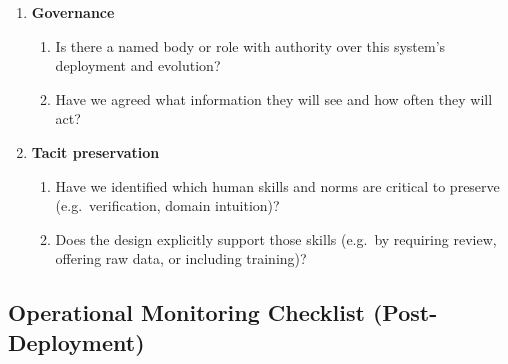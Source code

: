 \begin{enumerate}
\begin{enumerate}
                \begin{itemize}
                  \item time (how long the system can run before a deep
                        review)?
                  \item scale (how many users, patients, trades, etc.)?
                  \item domain (which segments or contexts)?
                \end{itemize}
          \item Are there explicit triggers for pausing, rolling back,
                or redesigning (performance drops, incident rates,
                context changes)?
        \end{enumerate}
  \item \textbf{Governance}
        \begin{enumerate}
          \item Is there a named body or role with authority over this
                system’s deployment and evolution?
          \item Have we agreed what information they will see and how
                often they will act?
        \end{enumerate}
  \item \textbf{Tacit preservation}
        \begin{enumerate}
          \item Have we identified which human skills and norms are
                critical to preserve (e.g.\ verification, domain
                intuition)?
          \item Does the design explicitly support those skills
                (e.g.\ by requiring review, offering raw data, or
                including training)?
        \end{enumerate}
\end{enumerate}

\subsection{Operational Monitoring Checklist (Post-Deployment)}

